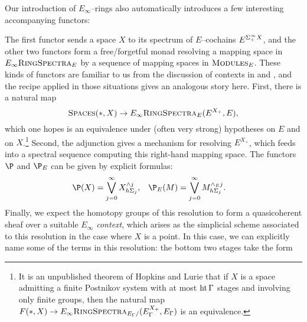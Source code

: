 Our introduction of \(E_\infty\)--rings also automatically introduces a few interesting accompanying functors:
\begin{center}
\end{center}
The first functor sends a space \(X\) to its spectrum of \(E\)--cochains \(E^{\Sigma^\infty_+ X}\), and the other two functors form a free/forgetful monad resolving a mapping space in \(E_\infty\normalfont\textsc{RingSpectra}_E\) by a sequence of mapping spaces in \(\normalfont\textsc{Modules}_E\).  These kinds of functors are familiar to us from the discussion of contexts in  and , and the recipe applied in those situations gives an analogous story here.  First, there is a natural map \[\normalfont\textsc{Spaces}(*, X) \to E_\infty\normalfont\textsc{RingSpectra}_E(E^{X_+}, E),\] which one hopes is an equivalence under (often very strong) hypotheses on \(E\) and on \(X\).\footnote{It is an unpublished theorem of Hopkins and Lurie that if \(X\) is a space admitting a finite Postnikov system with at most \(\operatorname{ht} \Gamma\) stages and involving only finite groups, then the natural map \(F(*, X) \to E_\infty\normalfont\textsc{RingSpectra}_{E_\Gamma/}(E_\Gamma^{X_+}, E_\Gamma)\) is an equivalence.}  Second, the adjunction gives a mechanism for resolving \(E^{X_+}\), which feeds into a spectral sequence computing this right-hand mapping space.  The functors \(\P\) and \(\P_E\) can be given by explicit formulas:
\begin{align*}
\P(X) & = \bigvee_{j=0}^\infty X^{\sm j}_{h\Sigma_j}, &
\P_E(M) & = \bigvee_{j=0}^\infty M^{\sm_E j}_{h\Sigma_j}.
\end{align*}
Finally, we expect the homotopy groups of this resolution to form a quasicoherent sheaf over a suitable \emph{\(E_\infty\) context}, which arises as the simplicial scheme associated to this resolution in the case where \(X\) is a point.  In this case, we can explicitly name some of the terms in this resolution: the bottom two stages take the form
\begin{center}
\end{center}
